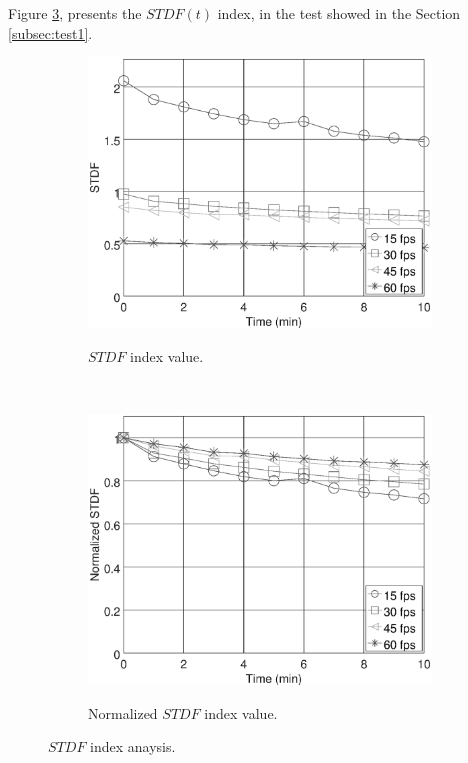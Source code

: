 \documentclass[review]{elsarticle}
\begin{document}
Figure \ref{fig:STDFtest1}, presents the $STDF(t)$ index, in the test showed in the 
Section \ref{subsec:test1}.
\begin{figure}[ht!]
    \centering
    \begin{subfigure}{0.48\textwidth}
        \caption{$STDF$ index value.}
        \includegraphics[width=\textwidth]{FPS_f11_rawSTDF.eps}
        \label{fig:stdfraw}
    \end{subfigure}
    ~ %
    \begin{subfigure}{0.48\textwidth}
        \caption{Normalized $STDF$ index value.}
        \includegraphics[width=\textwidth]{FPS_f11_norm1STDF.eps}
        \label{fig:stdfnorm}
    \end{subfigure}
    \caption{$STDF$ index anaysis.}\label{fig:STDFtest1}
\end{figure}
\end{document}
